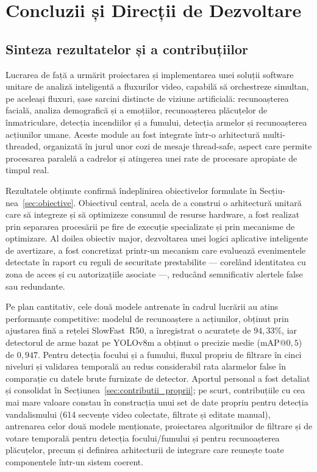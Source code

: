 \documentclass[../../main.tex]{subfiles}
\begin{document}
\chapter{Concluzii și Direcții de Dezvoltare}
\label{ch:concluzii}

\section{Sinteza rezultatelor și a contribuțiilor}
\label{sec:sinteza_rezultate}

Lucrarea de față a urmărit proiectarea și implementarea unei soluții software unitare de analiză inteligentă a fluxurilor video, capabilă să orchestreze simultan, pe aceleași fluxuri, șase sarcini distincte de viziune artificială: recunoașterea facială, analiza demografică și a emoțiilor, recunoașterea plăcuțelor de înmatriculare, detecția incendiilor și a fumului, detecția armelor și recunoașterea acțiunilor umane. Aceste module au fost integrate într-o arhitectură multi-threaded, organizată în jurul unor cozi de mesaje thread-safe, aspect care permite procesarea paralelă a cadrelor și atingerea unei rate de procesare apropiate de timpul real.

Rezultatele obținute confirmă îndeplinirea obiectivelor formulate în Secțiu-nea~\ref{sec:obiective}. Obiectivul central, acela de a construi o arhitectură unitară care să integreze și să optimizeze consumul de resurse hardware, a fost realizat prin separarea procesării pe fire de execuție specializate și prin mecanisme de optimizare. Al doilea obiectiv major, dezvoltarea unei logici aplicative inteligente de avertizare, a fost concretizat printr-un mecanism care evaluează evenimentele detectate în raport cu reguli de securitate prestabilite — corelând identitatea cu zona de acces și cu autorizațiile asociate —, reducând semnificativ alertele false sau redundante.

Pe plan cantitativ, cele două modele antrenate în cadrul lucrării au atins performanțe competitive: modelul de recunoaștere a acțiunilor, obținut prin ajustarea fină a rețelei SlowFast~R50, a înregistrat o acuratețe de $94{,}33\%$, iar detectorul de arme bazat pe YOLOv8m a obținut o precizie medie (mAP@$0{,}5$) de $0{,}947$. Pentru detecția focului și a fumului, fluxul propriu de filtrare în cinci niveluri și validarea temporală au redus considerabil rata alarmelor false în comparație cu datele brute furnizate de detector. Aportul personal a fost detaliat și consolidat în Secțiunea~\ref{sec:contributii_proprii}; pe scurt, contribuțiile cu cea mai mare valoare constau în construcția unui set de date propriu pentru detecția vandalismului (614 secvențe video colectate, filtrate și editate manual), antrenarea celor două modele menționate, proiectarea algoritmilor de filtrare și de votare temporală pentru detecția focului/fumului și pentru recunoașterea plăcuțelor, precum și definirea arhitecturii de integrare care reunește toate componentele într-un sistem coerent.
\end{document}
